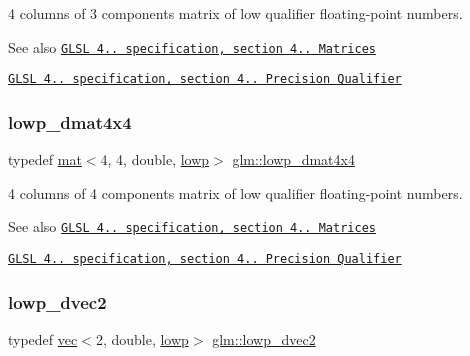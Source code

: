 4 columns of 3 components matrix of low qualifier floating-\/point numbers.

\begin{DoxySeeAlso}{See also}
\href{http://www.opengl.org/registry/doc/GLSLangSpec.4.20.8.pdf}{\tt G\+L\+SL 4.. specification, section 4.. Matrices} 

\href{http://www.opengl.org/registry/doc/GLSLangSpec.4.20.8.pdf}{\tt G\+L\+SL 4.. specification, section 4.. Precision Qualifier} 
\end{DoxySeeAlso}
\mbox{\label{group__core__precision_ga336afc91799f59d9075eb94c3093612f}} 
\subsubsection{\texorpdfstring{lowp\+\_\+dmat4x4}{lowp\_dmat4x4}}
{\footnotesize\ttfamily typedef \mbox{\hyperlink{structglm_1_1mat}{mat}}$<$4, 4, double, \mbox{\hyperlink{namespaceglm_a36ed105b07c7746804d7fdc7cc90ff25ae161af3fc695e696ce3bf69f7332bc2d}{lowp}}$>$ \mbox{\hyperlink{group__core__precision_ga336afc91799f59d9075eb94c3093612f}{glm\+::lowp\+\_\+dmat4x4}}}

4 columns of 4 components matrix of low qualifier floating-\/point numbers.

\begin{DoxySeeAlso}{See also}
\href{http://www.opengl.org/registry/doc/GLSLangSpec.4.20.8.pdf}{\tt G\+L\+SL 4.. specification, section 4.. Matrices} 

\href{http://www.opengl.org/registry/doc/GLSLangSpec.4.20.8.pdf}{\tt G\+L\+SL 4.. specification, section 4.. Precision Qualifier} 
\end{DoxySeeAlso}
\mbox{\label{group__core__precision_gab2db907304a5b726a369c351e02357fe}} 
\subsubsection{\texorpdfstring{lowp\+\_\+dvec2}{lowp\_dvec2}}
{\footnotesize\ttfamily typedef \mbox{\hyperlink{structglm_1_1vec}{vec}}$<$2, double, \mbox{\hyperlink{namespaceglm_a36ed105b07c7746804d7fdc7cc90ff25ae161af3fc695e696ce3bf69f7332bc2d}{lowp}}$>$ \mbox{\hyperlink{group__core__precision_gab2db907304a5b726a369c351e02357fe}{glm\+::lowp\+\_\+dvec2}}}

